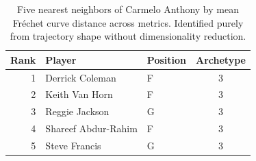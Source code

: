 \begin{table}[htbp]
  \centering\small
  \begin{tabular}{rllc}
    \toprule
    Rank & Player & Position & Archetype \\
    \midrule
    1 & Derrick Coleman & F & 3 \\
    2 & Keith Van Horn & F & 3 \\
    3 & Reggie Jackson & G & 3 \\
    4 & Shareef Abdur-Rahim & F & 3 \\
    5 & Steve Francis & G & 3 \\
    \bottomrule
  \end{tabular}
  \caption{Five nearest neighbors of Carmelo Anthony by mean Fr\'{e}chet curve distance across metrics. Identified purely from trajectory shape without dimensionality reduction.}
  \label{tab:Carmelo_Anthony_frechet_curve_neighbors}
\end{table}

